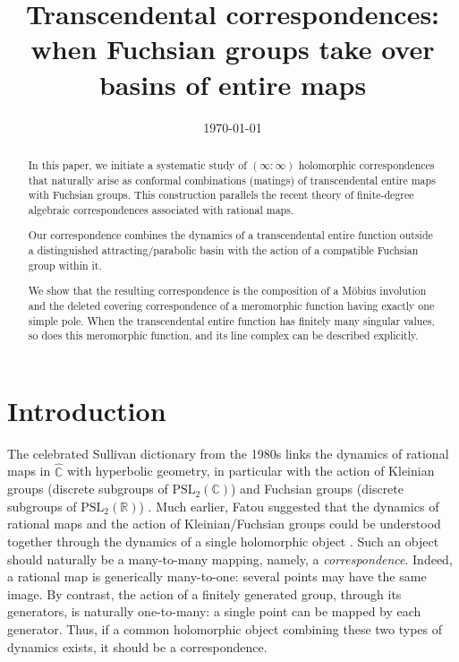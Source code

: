 \documentclass[11pt,a4paper, oneside]{amsart}
\title[Transcendental correspondences along basins]
{Transcendental correspondences: when Fuchsian groups take over basins of entire maps}
\date{\today}
\theoremstyle{definition}
\theoremstyle{remark}
\numberwithin{equation}{section}
\newcommand{\C}{\mathbb{C}}
\newcommand{\Cc}{\widehat{{\C}}}
\begin{document}
\begin{abstract}
  In this paper, we initiate a systematic study of $(\infty : \infty)$ holomorphic correspondences that naturally arise as conformal combinations (matings) of transcendental entire maps with Fuchsian groups. This construction parallels the recent theory of finite-degree algebraic correspondences associated with rational maps. 
  
  Our correspondence combines the dynamics of a transcendental entire function outside a distinguished attracting/parabolic basin with the action of a compatible Fuchsian group within it.  

We show that the resulting correspondence is the composition of a M{\"o}bius involution and the deleted covering correspondence of a meromorphic function having exactly one simple pole. When the transcendental entire function has finitely many singular values, so does this meromorphic function, and its line complex can be described explicitly. 
\end{abstract}



\maketitle

\setcounter{tocdepth}{1}
\tableofcontents

\section{Introduction}\label{intro_sec}
The celebrated Sullivan dictionary from the 1980s links the dynamics of rational maps in $\Cc$ with hyperbolic geometry, in particular with the action of Kleinian groups (discrete subgroups of $\mathrm{PSL}_2(\mathbb C)$) and Fuchsian groups (discrete subgroups of $\mathrm{PSL}_2(\mathbb R)$) \cite{Sul85}. Much earlier, Fatou suggested that the dynamics of rational maps and the action of Kleinian/Fuchsian groups could be understood together through the dynamics of a single holomorphic object \cite{Fat29}. Such an object should naturally be a many-to-many mapping, namely, a \emph{correspondence}. Indeed, a rational map is generically many-to-one: several points may have the same image. By contrast, the action of a finitely generated group, through its generators, is naturally one-to-many: a single point can be mapped by each generator. Thus, if a common holomorphic object combining these two types of dynamics exists, it should be a correspondence.
\end{document}
